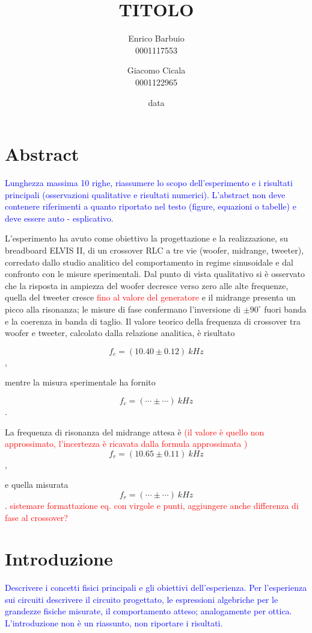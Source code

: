 \documentclass[12pt,italian]{article}
\title{TITOLO}
\author{Enrico Barbuio \\ 0001117553 \and Giacomo Cicala \\ 0001122965}
\date{data}
\newcommand{\prof}[1]{\textcolor{blue}{#1}}
\newcommand{\err}[1]{\textcolor{red}{#1}}
\begin{document}
\maketitle
\section*{Abstract}
\prof{ Lunghezza massima 10 righe, riassumere lo scopo dell'esperimento e i
	risultati principali (osservazioni qualitative e risultati numerici).
	L'abstract non deve contenere riferimenti a quanto riportato nel testo
	(figure, equazioni o tabelle) e deve essere auto - esplicativo. }

L'esperimento ha avuto come obiettivo la progettazione e la realizzazione, su
breadboard ELVIS II, di un crossover RLC a tre vie (woofer, midrange, tweeter),
corredato dallo studio analitico del comportamento in regime sinusoidale e dal
confronto con le misure sperimentali. Dal punto di vista qualitativo si è
osservato che la risposta in ampiezza del woofer decresce verso zero alle alte
frequenze, quella del tweeter cresce \err{fino al valore del generatore} e il
midrange presenta un picco alla risonanza; le misure di fase confermano
l'inversione di $ \pm 90^\circ $ fuori banda e la coerenza in banda di taglio.
Il valore teorico della frequenza di crossover tra woofer e tweeter, calcolato
dalla relazione analitica, è risultato

\begin{equation*}
	f_{c} = (10.40 \pm 0.12)  \ kHz
\end{equation*},

\noindent
mentre la misura sperimentale ha fornito

\begin{equation*}
	f_{c} = (\cdots \pm \cdots) \ kHz
\end{equation*}.

\noindent
La frequenza di risonanza del midrange attesa è \err{(il valore è quello non approssimato, l'incertezza è ricavata dalla formula approssimata )}
\begin{equation*}
	f_{r} = (10.65 \pm 0.11)  \ kHz
\end{equation*},

\noindent
e quella misurata
\begin{equation*}
	f_{r} = (\cdots \pm \cdots)  \ kHz
\end{equation*}.
\err{sistemare formattazione eq. con virgole e punti, aggiungere anche differenza di fase al crossover?}

\section*{Introduzione}
\prof{ Descrivere i concetti fisici principali e gli obiettivi dell'esperienza.
	Per l'esperienza sui circuiti descrivere il circuito progettato, le
	espressioni algebriche per le grandezze fisiche misurate, il comportamento
	atteso; analogamente per ottica. L'introduzione non è un riassunto, non
	riportare i risultati.}
\end{document}
